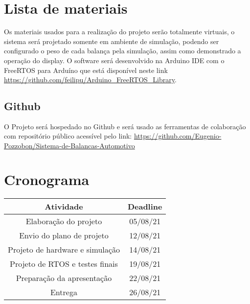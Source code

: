 \documentclass[a4paper, 12pt]{article}
\begin{document}
	\section{Lista de materiais}
	Os materiais usados para a realização do projeto serão totalmente virtuais, o sistema será projetado somente em ambiente de simulação, podendo ser configurado o peso de cada balança pela simulação, assim como demonstrado a operação do display. O software será desenvolvido na Arduino IDE com o FreeRTOS para Arduíno que está disponível neste link \url{https://github.com/feilipu/Arduino_FreeRTOS_Library}.
	
	\subsection{Github}
	O Projeto será hospedado no Github e será usado as ferramentas de colaboração com repositório público acessível pelo link: \url{https://github.com/Eugenio-Pozzobon/Sistema-de-Balancas-Automotivo}
	
	\section{Cronograma}
	\begin{table}[htb]
		\centering
		\begin{tabular}{c|c}
			Atividade & Deadline \\ \hline
			Elaboração do projeto & 05/08/21 \\ \hline
			Envio do plano de projeto & 12/08/21 \\ \hline
			Projeto de hardware e simulação & 14/08/21 \\ \hline
			Projeto de RTOS e testes finais & 19/08/21 \\ \hline
			Preparação da apresentação & 22/08/21 \\ \hline
			Entrega	& 26/08/21\\
		\end{tabular}
	\end{table}
	
	
\end{document}
